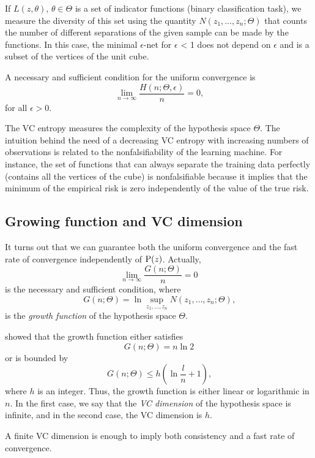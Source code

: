If $L(z, \theta)$, $\theta \in \Theta$ is a set of indicator functions (binary
classification task),  we measure the diversity of this set using the quantity $N(z_1,
\dots, z_n; \Theta)$ that counts the number of different separations of the given sample
can be made by the functions.  In this case, the minimal $\epsilon$-net for $\epsilon$ < 1
does not depend on $\epsilon$ and is a subset of the vertices of the unit cube.

A necessary and sufficient condition for the uniform convergence is
\begin{equation}
  \label{eq:uniform-convergence}
  \lim_{n \to \infty} \frac{H(n; \Theta, \epsilon)}{n} = 0\text{,}
\end{equation}
for all $\epsilon > 0$.

The VC entropy measures the complexity of the hypothesis space $\Theta$.  The intuition
behind the need of a decreasing VC entropy with increasing numbers of observations is
related to the nonfalsifiability of the learning machine.  For instance, the set of
functions that can always separate the training data perfectly (contains all the vertices
of the cube) is nonfalsifiable because
it implies that the minimum of the empirical risk is zero independently of the value of
the true risk.

\subsection{Growing function and VC dimension}

It turns out that we can guarantee both the uniform convergence and the fast rate of
convergence independently of $\operatorname{P}(z)$.  Actually,
\[
  \lim_{n \to \infty} \frac{G(n; \Theta)}{n} = 0
\]
is the necessary and sufficient condition, where
\[
  G(n; \Theta) = \ln \sup_{z_1, \dots, z_n} N(z_1, \dots, z_n; \Theta)\text{,}
\]
is the \emph{growth function} of the hypothesis space $\Theta$.

\citeauthor{Vapnik1968} showed that the growth function either
satisfies
\[
  G(n; \Theta) = n \ln 2
\]
or is bounded by
\[
  G(n; \Theta) \leq h \left( \ln \frac{l}{n} + 1 \right)\text{,}
\]
where $h$ is an integer.  Thus, the growth function is either linear or logarithmic in
$n$.  In the first case, we say that the \emph{VC dimension} of the hypothesis space is
infinite, and in the second case, the VC dimension is $h$.

A finite VC dimension is enough to imply both consistency and a fast rate of convergence.

